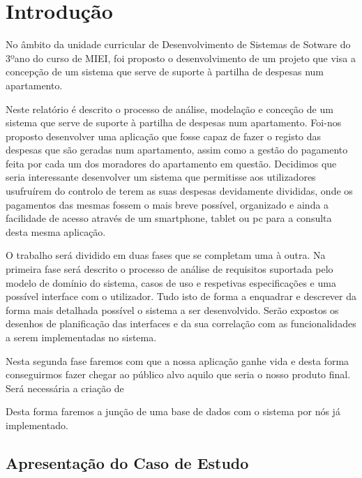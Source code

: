 \chapter{Introdução}

No âmbito da unidade curricular de Desenvolvimento de Sistemas de Sotware do 3ºano do curso de MIEI,  foi proposto o desenvolvimento de um projeto que visa a concepção de um sistema que serve de suporte à partilha de despesas num apartamento.

Neste relatório é descrito o processo de análise, modelação e conceção de um sistema que serve de suporte à partilha de despesas num apartamento. Foi-nos proposto desenvolver uma aplicação que fosse capaz de fazer o registo das despesas que são geradas num apartamento, assim como a gestão do pagamento feita por cada um dos moradores do apartamento em questão.
Decidimos que seria interessante desenvolver um sistema que permitisse aos utilizadores usufruírem do controlo de terem as suas despesas devidamente divididas, onde os pagamentos das mesmas fossem o mais breve possível, organizado e ainda a facilidade de acesso através de um smartphone, tablet ou pc para a consulta desta mesma aplicação.

O trabalho será dividido em duas fases que se completam uma à outra.
Na primeira fase será descrito o processo de análise de requisitos suportada pelo modelo de domínio do sistema, casos de uso e respetivas especificações e uma possível interface com o utilizador. Tudo isto de forma a enquadrar e descrever da forma mais detalhada possível o sistema a ser desenvolvido. Serão expostos os desenhos de planificação das interfaces e da sua correlação com as funcionalidades a serem implementadas no sistema.

Nesta segunda fase faremos com que a nossa aplicação ganhe vida e desta forma conseguirmos fazer chegar ao público alvo aquilo que seria o nosso produto final. Será necessária a criação de 


 Desta forma faremos a junção de uma base de dados com o sistema por nós já implementado.

\section{Apresentação do Caso de Estudo}

